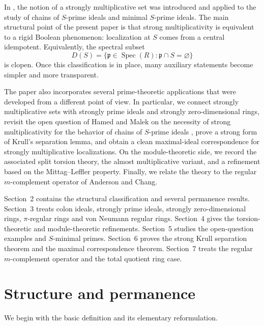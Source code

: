 \documentclass[11pt]{amsart}
\theoremstyle{definition}
\theoremstyle{remark}
\newcommand{\Spec}{\operatorname{Spec}}
\begin{document}
In \cite{Hamed}, the notion of a strongly multiplicative set was introduced and applied to the study of chains of $S$-prime ideals and minimal $S$-prime ideals.
The main structural point of the present paper is that strong multiplicativity is equivalent to a rigid Boolean phenomenon: localization at $S$ comes from a central idempotent.
Equivalently, the spectral subset
\[
D(S)=\{\mathfrak p \in \Spec(R): \mathfrak p \cap S=\varnothing\}
\]
is clopen.
Once this classification is in place, many auxiliary statements become simpler and more transparent.

The paper also incorporates several prime-theoretic applications that were developed from a different point of view.
In particular, we connect strongly multiplicative sets with strongly prime ideals and strongly zero-dimensional rings, revisit the open question of Hamed and Malek on the necessity of strong multiplicativity for the behavior of chains of $S$-prime ideals \cite{Hamed}, prove a strong form of Krull's separation lemma, and obtain a clean maximal-ideal correspondence for strongly multiplicative localizations.
On the module-theoretic side, we record the associated split torsion theory, the almost multiplicative variant, and a refinement based on the Mittag--Leffler property.
Finally, we relate the theory to the regular $m$-complement operator of Anderson and Chang.

Section~2 contains the structural classification and several permanence results.
Section~3 treats colon ideals, strongly prime ideals, strongly zero-dimensional rings, $\pi$-regular rings and von Neumann regular rings.
Section~4 gives the torsion-theoretic and module-theoretic refinements.
Section~5 studies the open-question examples and $S$-minimal primes.
Section~6 proves the strong Krull separation theorem and the maximal correspondence theorem.
Section~7 treats the regular $m$-complement operator and the total quotient ring case.

\section{Structure and permanence}

We begin with the basic definition and its elementary reformulation.
\end{document}

